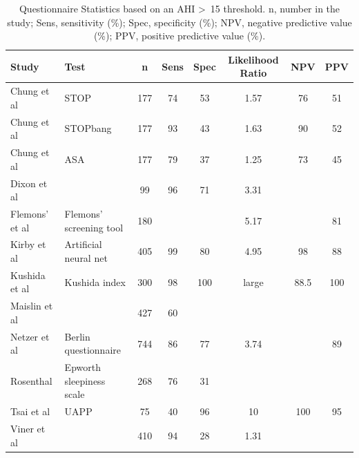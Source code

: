 \begin{table}[h]
\centering
\begin{tabular}{l l c c c c c c}
\toprule
Study&Test&n&Sens&Spec&Likelihood Ratio&NPV&PPV\\ \midrule
Chung et al&STOP&177&74&53&1.57&76&51\\ 
Chung et al&STOPbang&177&93&43&1.63&90&52\\ 
Chung et al&ASA&177&79&37&1.25&73&45\\ 
Dixon et al&&99&96&71&3.31&&\\ 
Flemons' et al&Flemons' screening tool&180&&&5.17&&81\\ 
Kirby et al&Artificial neural net&405&99&80&4.95&98&88\\ 
Kushida et al&Kushida index&300&98&100&large&88.5&100\\ 
Maislin et al&&427&60&&&&\\ 
Netzer et al&Berlin questionnaire&744&86&77&3.74&&89\\ 
Rosenthal&Epworth sleepiness scale&268&76&31&&&\\ 
Tsai et al&UAPP&75&40&96&10&100&95\\ 
Viner et al&&410&94&28&1.31&&\\ \bottomrule
\end{tabular}
\caption{Questionnaire Statistics based on an AHI \textgreater\ 15 threshold. n, number in the study; Sens, sensitivity (\%); Spec, specificity (\%); NPV, negative predictive value (\%); PPV, positive predictive value (\%).}
\label{table:questionnaire}
\end{table}
